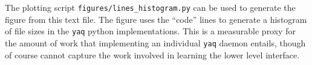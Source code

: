 \documentclass[11pt, full]{article}
\newcommand\yaq{\texttt{yaq}}
\begin{document}
The plotting script \texttt{figures/lines\_histogram.py} can be used to generate the figure from this text file.
The figure uses the ``code'' lines to generate a histogram of file sizes in the \yaq{} python implementations.
This is a measurable proxy for the amount of work that implementing an individual \yaq{} daemon entails, though of course cannot capture the work involved in learning the lower level interface.

\clearpage

\printbibliography
\end{document}
